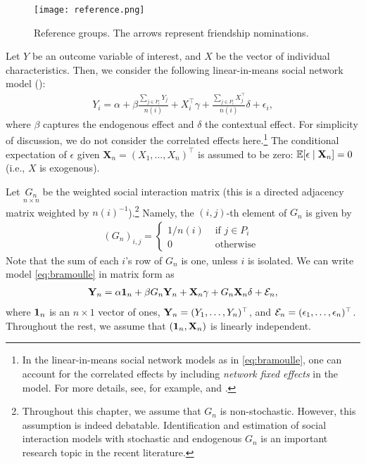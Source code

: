 \documentclass[11pt, A4paper, openany, uplatex]{book}
\begin{document}
\begin{figure}[h!]
	\begin{center}
	\texttt{[image: reference.png]}
	\caption{Reference groups. The arrows represent friendship nominations.}
	\end{center}
\end{figure}

Let $Y$ be an outcome variable of interest, and $X$ be the vector of individual characteristics. Then, we consider the following linear-in-means social network model (\cite{bramoulle2009identification}):
\begin{align}\label{eq:bramoulle}
	Y_i = \alpha + \beta \frac{\sum_{j \in P_i} Y_j}{n(i)} + X_i^\top \gamma +  \frac{\sum_{j \in P_i} X_j^\top}{n(i)} \delta + \epsilon_i, 
\end{align}
where $\beta$ captures the endogenous effect and $\delta$ the contextual effect.
For simplicity of discussion, we do not consider the correlated effects here.\footnote{
	In the linear-in-means social network models as in \eqref{eq:bramoulle}, one can account for the correlated effects by including  \textit{network fixed effects} in the model.
	For more details, see, for example, \cite{lee2007identification} and \cite{bramoulle2009identification}.
	}
The conditional expectation of $\epsilon$ given $\mathbf{X}_n = (X_1, \ldots, X_n)^\top$ is assumed to be zero: $\mathbb{E}[\epsilon \mid \mathbf{X}_n] = 0$ (i.e., $X$ is exogenous).

Let $\underset{n \times n}{G_n}$ be the weighted social interaction matrix (this is a directed adjacency matrix weighted by $n(i)^{-1}$).\footnote{
	Throughout this chapter, we assume that $G_n$ is non-stochastic.
	However, this assumption is indeed debatable.
	Identification and estimation of social interaction models with stochastic and endogenous $G_n$ is an important research topic in the recent literature.
}
Namely, the $(i,j)$-th element of $G_n$ is given by
\begin{align*}
	 (G_n)_{i,j} = \left\{\begin{array}{ll}
	1/n(i) & \text{ if } j \in P_i \\
	0 & \text{ otherwise }
	\end{array}\right.
\end{align*}
Note that the sum of each $i$'s row of $G_n$ is one, unless $i$ is isolated.
We can write model \eqref{eq:bramoulle} in matrix form as
\begin{align}\label{eq:bramat}
	\mathbf{Y}_n = \alpha \mathbf{1}_n + \beta G_n \mathbf{Y}_n + \mathbf{X}_n \gamma +  G_n \mathbf{X}_n \delta + \mathcal{E}_n, 
\end{align}
where $\mathbf{1}_n$ is an $n\times 1$ vector of ones, $\mathbf{Y}_n = (Y_1, \ldots, Y_n)^\top$, and $\mathcal{E}_n = (\epsilon_1, \ldots, \epsilon_n)^\top$.
Throughout the rest, we assume that $(\mathbf{1}_n, \mathbf{X}_n)$ is linearly independent.
\end{document}
